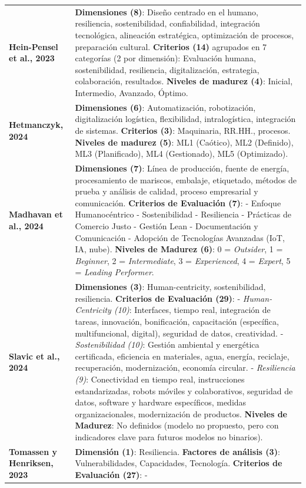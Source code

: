 \documentclass{article}
\begin{document}
\begin{longtable}[]{@{}
  >{\raggedright\arraybackslash}p{}
  >{\raggedright\arraybackslash}p{}@{}}
\textbf{Hein-Pensel et al., 2023} & \textbf{Dimensiones (8)}: Diseño
centrado en el humano, resiliencia, sostenibilidad, confiabilidad,
integración tecnológica, alineación estratégica, optimización de
procesos, preparación cultural. \textbf{Criterios (14)} agrupados en 7
categorías (2 por dimensión): Evaluación humana, sostenibilidad,
resiliencia, digitalización, estrategia, colaboración, resultados.
\textbf{Niveles de madurez (4)}: Inicial, Intermedio, Avanzado,
Óptimo. \\
\textbf{Hetmanczyk, 2024} & \textbf{Dimensiones (6)}: Automatización,
robotización, digitalización logística, flexibilidad, intralogística,
integración de sistemas. \textbf{Criterios (3)}: Maquinaria, RR.HH.,
procesos. \textbf{Niveles de madurez (5)}: ML1 (Caótico), ML2
(Definido), ML3 (Planificado), ML4 (Gestionado), ML5 (Optimizado). \\
\textbf{Madhavan et al., 2024} & \textbf{Dimensiones (7)}: Línea de
producción, fuente de energía, procesamiento de mariscos, embalaje,
etiquetado, métodos de prueba y análisis de calidad, proceso empresarial
y comunicación. \textbf{Criterios de Evaluación (7)}: - Enfoque
Humanocéntrico - Sostenibilidad - Resiliencia - Prácticas de Comercio
Justo - Gestión Lean - Documentación y Comunicación - Adopción de
Tecnologías Avanzadas (IoT, IA, nube). \textbf{Niveles de Madurez (6)}:
0 = \emph{Outsider}, 1 = \emph{Beginner}, 2 = \emph{Intermediate}, 3 =
\emph{Experienced}, 4 = \emph{Expert}, 5 = \emph{Leading Performer}. \\
\textbf{Slavic et al., 2024} & \textbf{Dimensiones (3)}:
Human-centricity, sostenibilidad, resiliencia. \textbf{Criterios de
Evaluación (29)}: - \emph{Human-Centricity (10)}: Interfaces, tiempo
real, integración de tareas, innovación, bonificación, capacitación
(específica, multifuncional, digital), seguridad de datos, creatividad.
- \emph{Sostenibilidad (10)}: Gestión ambiental y energética
certificada, eficiencia en materiales, agua, energía, reciclaje,
recuperación, modernización, economía circular. - \emph{Resiliencia
(9)}: Conectividad en tiempo real, instrucciones estandarizadas, robots
móviles y colaborativos, seguridad de datos, software y hardware
específicos, medidas organizacionales, modernización de productos.
\textbf{Niveles de Madurez}: No definidos (modelo no propuesto, pero con
indicadores clave para futuros modelos no binarios). \\
\textbf{Tomassen y Henriksen, 2023} & \textbf{Dimensión (1)}:
Resiliencia. \textbf{Factores de análisis (3)}: Vulnerabilidades,
Capacidades, Tecnología. \textbf{Criterios de Evaluación (27)}: -

\end{longtable}
\end{document}
